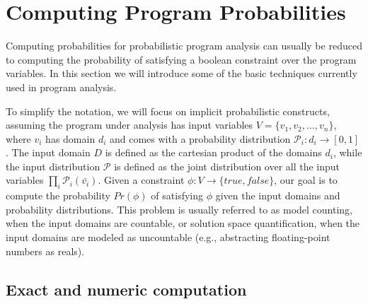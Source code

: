 \section{Computing Program Probabilities}
\label{sec:computingprobabilities}

Computing probabilities for probabilistic program analysis can usually be reduced to computing the probability of satisfying a boolean constraint over the program variables. In this section we will introduce some of the basic techniques currently used in program analysis. 

To simplify the notation, we will focus on implicit probabilistic constructs, assuming the program under analysis has input variables $V=\{v_1, v_2, \dots, v_n\}$, where $v_i$ has domain $d_i$ and comes with a probability distribution $\mathcal{P}_i: d_i \to [0, 1]$. The input domain $D$ is defined as the cartesian product of the domains $d_i$, while the input distribution $\mathcal{P}$ is defined as the joint distribution over all the input variables $\prod_i \mathcal{P}_i(\bar{v_i})$. Given a constraint $\phi: V \to \{true, false\}$, our goal is to compute the probability $Pr(\phi)$ of satisfying $\phi$ given the input domains and probability distributions. This problem is usually referred to as model counting, when the input domains are countable, or solution space quantification, when the input domains are modeled as uncountable (e.g., abstracting floating-point numbers as reals).

\subsection{Exact and numeric computation}\label{sec:computingprobabilitiesExact}

%		

